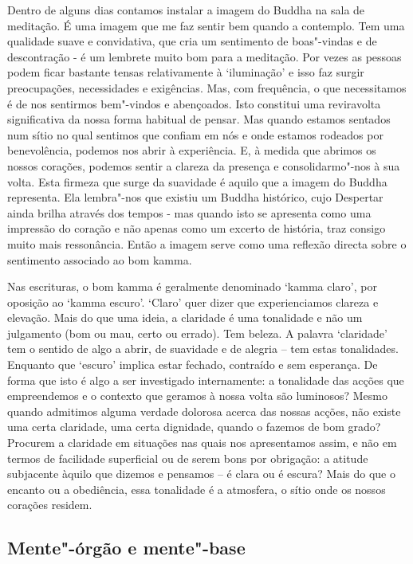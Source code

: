Dentro de alguns dias contamos instalar a imagem do Buddha na sala de meditação.
É uma imagem que me faz sentir bem quando a contemplo. Tem uma qualidade suave e
convidativa, que cria um sentimento de boas"-vindas e de descontração - é um
lembrete muito bom para a meditação. Por vezes as pessoas podem ficar bastante
tensas relativamente à `iluminação' e isso faz surgir preocupações, necessidades
e exigências. Mas, com frequência, o que necessitamos é de nos sentirmos
bem"-vindos e abençoados. Isto constitui uma reviravolta significativa da nossa
forma habitual de pensar. Mas quando estamos sentados num sítio no qual sentimos
que confiam em nós e onde estamos rodeados por benevolência, podemos nos abrir à
experiência. E, à medida que abrimos os nossos corações, podemos sentir a
clareza da presença e consolidarmo"-nos à sua volta. Esta firmeza que surge da
suavidade é aquilo que a imagem do Buddha representa. Ela lembra"-nos que existiu
um Buddha histórico, cujo Despertar ainda brilha através dos tempos - mas quando
isto se apresenta como uma impressão do coração e não apenas como um excerto de
história, traz consigo muito mais ressonância. Então a imagem serve como uma
reflexão directa sobre o sentimento associado ao bom kamma.

Nas escrituras, o bom kamma é geralmente denominado `kamma claro', por oposição
ao `kamma escuro'. `Claro' quer dizer que experienciamos clareza e elevação.
Mais do que uma ideia, a claridade é uma tonalidade e não um julgamento (bom ou
mau, certo ou errado). Tem beleza. A palavra `claridade' tem o sentido de algo a
abrir, de suavidade e de alegria -- tem estas tonalidades. Enquanto que `escuro'
implica estar fechado, contraído e sem esperança. De forma que isto é algo a ser
investigado internamente: a tonalidade das acções que empreendemos e o contexto
que geramos à nossa volta são luminosos? Mesmo quando admitimos alguma verdade
dolorosa acerca das nossas acções, não existe uma certa claridade, uma certa
dignidade, quando o fazemos de bom grado? Procurem a claridade em situações nas
quais nos apresentamos assim, e não em termos de facilidade superficial ou de
serem bons por obrigação: a atitude subjacente àquilo que dizemos e pensamos --
é clara ou é escura? Mais do que o encanto ou a obediência, essa tonalidade é a
atmosfera, o sítio onde os nossos corações residem.

\subsection{Mente"-órgão e mente"-base}

